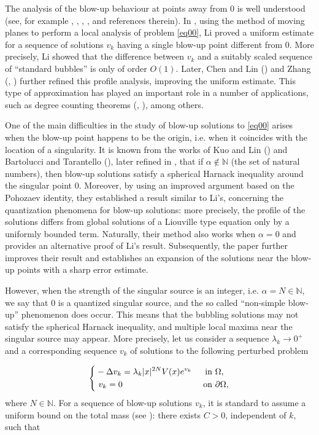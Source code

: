 \documentclass[reqno,11pt]{amsart}
\theoremstyle{definition}
\numberwithin{equation}{section}
\newcommand{\N}{\mathbb{N}}
\newcommand{\D}{\Delta}
\newcommand{\al}{\alpha}
\newcommand{\la}{\lambda}
\renewcommand{\(}{\left(}
\renewcommand{\)}{\right)}
\renewcommand{\[}{\left[}
\renewcommand{\]}{\right]}
\begin{document}
The   analysis  of the blow-up behaviour at points away from $0$  is well understood (see, for example \cite{breme}, \cite{chenlin0}, \cite{li}, \cite{lisha}, and references therein).  In  \cite{li}, using the method of moving planes to perform a local analysis of problem \eqref{eq00}, Li proved a uniform estimate for a sequence of solutions $v_k$ having a single blow-up point different from $0$. More precisely,  Li showed that the difference between $v_k$ and a suitably scaled sequence of “standard bubbles” is only of order   $O(1)$.
Later, Chen and Lin (\cite{ChenLin}) and  Zhang (\cite{zhang2006}, \cite{zha1}) further refined this profile analysis, improving the uniform estimate.  This type of approximation has played an important role in a number of applications, such as degree counting theorems (\cite{chenlin0}, \cite{ChenLin}), among others.

One of the main difficulties in the study of blow-up solutions to \eqref{eq00} arises when the blow-up point happens to be the origin, i.e. when it coincides with the location of a singularity. 
 It is known from the works of Kuo and Lin (\cite{KuoLin}) and  Bartolucci and Tarantello (\cite{bata}), later refined in \cite{bachenlita}, that if $\al\not\in\N$ (the set of natural numbers), then blow-up solutions satisfy a spherical Harnack inequality around the singular point $0$. Moreover,  by using an improved argument based on the Pohozaev identity,  they established a result similar
to Li’s, concerning
the quantization phenomena for blow-up solutions: more precisely,  the profile of the solutions
differs from global solutions of a Liouville type equation only by a uniformly
bounded term. Naturally, their method also works when  $\alpha=0$ and provides an alternative proof of Li’s result. Subsequently, the paper \cite{zha1} further  improves their result and establishes an expansion of the solutions near the blow-up points with a sharp error estimate.
 
 However, when the strength of the singular source is an integer, i.e.  $\al=N\in\N$,  we say that $0$ is a quantized singular source, and the so called “non-simple blow-up” phenomenon does occur. This means that the bubbling solutions may not satisfy the spherical  Harnack inequality, and multiple local maxima near the singular source may appear. More precisely, let us consider a sequence $\la_k\to 0^+$ and a corresponding sequence $v_k$ of solutions  to the following perturbed problem

\begin{equation}\label{eq000}
  \left\{
      \begin{aligned}&- \D v_k = \la_k |x|^{2N}V(x)e^{v_k}
      &  \hbox{ in }&  \Omega,\\
    &  \ v_k=0 &  \hbox{ on }& \partial \Omega,
  \end{aligned}
    \right. \end{equation}
    where $N\in\N$.
    For a sequence of blow-up solutions $v_k$, it is standard
to assume a uniform bound on the total mass (see \cite{batta}): there
exists $C > 0$, independent of $k$, such that
\end{document}
